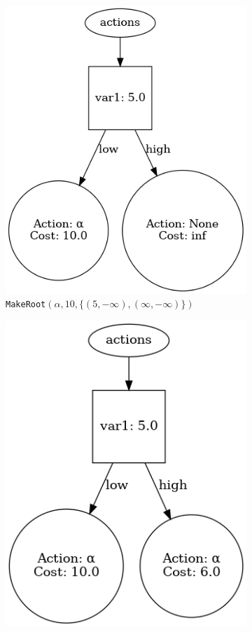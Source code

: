 \documentclass{article}
\begin{document}
\begin{figure}[H]
    \centering
    \caption{%
        Complete trace of converting the Q-tree in Figure~\ref{fig:QForest} to
        a single decision tree.
    }\label{fig:traceComplete}
    \begin{subfigure}[t]{0.31\textwidth}
        \centering
        \includegraphics[width=.8\textwidth]{exampleBuild0}
        \captionsetup{labelformat=empty}
        \caption{%
            \texttt{MakeRoot}$(\alpha, 10, \{ (5, -\infty),
            (\infty, -\infty) \})$
        }
        \vspace{3ex}
    \end{subfigure}
    \begin{subfigure}[t]{0.3\textwidth}
        \centering
        \includegraphics[width=.8\textwidth]{exampleBuild1}

\end{subfigure}
\end{figure}
\end{document}
